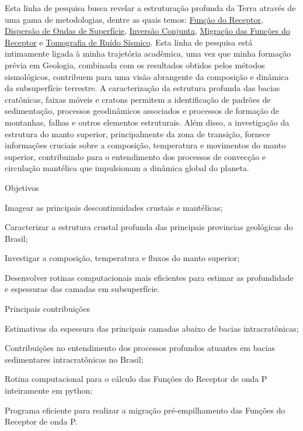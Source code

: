 \documentclass[10pt,a4paper,oneside]{book}
\begin{document}
Esta linha de pesquisa busca revelar a estruturação profunda da Terra através de uma gama de metodologias, dentre as quais temos: \href{https://doi.org/10.1029/JB084iB09p04749}{Função do Receptor}, \href{https://doi.org/10.1111/j.1365-246X.1990.tb04573.x}{Dispersão de Ondas de Superfície}, \href{https://doi.org/10.1046/j.1365-246x.2000.00217.x}{Inversão Conjunta}, \href{https://doi.org/10.1016/j.epsl.2013.08.025}{Migração das Funções do Receptor} e \href{https://doi.org/10.1111/j.1365-246X.2007.03374.x}{Tomografia de Ruído Sísmico}. Esta linha de pesquisa está intimamente ligada à minha trajetória acadêmica, uma vez que minha formação prévia em Geologia, combinada com os resultados obtidos pelos métodos sismológicos, contribuem para uma visão abrangente da composição e dinâmica da subsuperfície terrestre. A caracterização da estrutura profunda das bacias cratônicas, faixas móveis e cratons permitem a identificação de padrões de sedimentação, processos geodinâmicos associados e processos de formação de montanhas, falhas e outros elementos estruturais. Além disso, a investigação da estrutura do manto superior, principalmente da zona de transição, fornece informações cruciais sobre a composição, temperatura e movimentos do manto superior, contribuindo para o entendimento dos processos de convecção e circulação mantélica que impulsionam a dinâmica global do planeta.  

\begin{fancyenum}{\faFutbol}{Objetivos}
	\item Imagear as principais descontinuidades crustais e mantélicas;
	\item Caracterizar a estrutura crustal profunda das principais provincias geológicas do Brasil;
	\item Investigar a composição, temperatura e fluxos do manto superior;
	\item Desenvolver rotinas computacionais mais eficientes para estimar as profundidade e espessuras das camadas em subsuperfície.
\end{fancyenum}

\begin{fancyenum}{\faCogs}{Principais contribuições}
	\item Estimativas da espessura das principais camadas abaixo de bacias intracratônicas;
	\item Contribuições no entendimento dos processos profundos atuantes em bacias sedimentares intracratônicas no Brasil;
	\item Rotina computacional para o cálculo das Funções do Receptor de onda P inteiramente em python;
	\item Programa eficiente para realizar a migração pré-empilhamento das Funções do Receptor de onda P.
\end{fancyenum}
\end{document}
